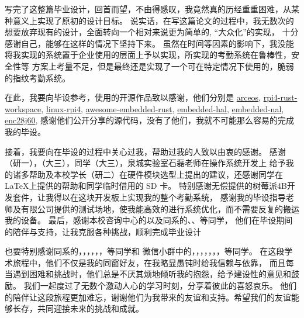 
写完了这整篇毕业设计，回首而望，不由得感叹，我竟然真的历经重重困难，从某种意义上实现了原初的设计目标。
说实话，在写这篇论文的过程中，我无数次的想要放弃现有的设计，全面转向一个相对来说更为简单的, “大众化”的实现，
十分感谢自己，能够在这样的情况下坚持下来。
虽然在时间等因素的影响下，我没能将我实现的系统置于企业使用的层面上予以实现，所实现的考勤系统在鲁棒性，安全性等
方案上考量不足，但是最终还是实现了一个可在特定情况下使用的，脆弱的指纹考勤系统。

在此，我要向毕设参考，使用的开源作品致以感谢，他们分别是 
\href{https://github.com/rcore-os/arceos.git}{arceos}, 
\href{https://github.com/jonlamb-gh/rpi4-rust-workspace.git}{rpi4-rust-workspace},
\href{https://github.com/raspberrypi/linux.git}{linux-rpi4},
\href{https://github.com/rust-embedded/awesome-embedded-rust.git}{awesome-embedded-rust},
\href{https://github.com/rust-embedded/embedded-hal.git}{embedded-hal},
\href{https://github.com/rust-embedded-community/embedded-nal}{embedded-nal},
\href{https://github.com/japaric/enc28j60.git}{enc28j60},
感谢他们公开分享的源代码，没有了他们，我就不可能那么容易的完成我的毕设。

接着，我要向在毕设的过程中关心过我，帮助过我的人致以由衷的感谢。
感谢（研一），（大三），同学（大三），泉城实验室石磊老师在操作系统开发上
给予我的诸多帮助及本校学长（研二）在硬件模块选型上提出的建议，还感谢同学在 \LaTeX 上提供的帮助和同学临时借用的 SD 卡。
特别感谢无偿提供的树莓派4B开发套件，让我得以在这块开发板上实现我的整个考勤系统，
感谢我的毕设指导老师及有限公司提供的测试场地，使我能高效的进行系统优化，而不需要反复的搬运我的设备。
最后，感谢本校咨询中心的以及同系的、、等同学，
他们在毕设期间的陪伴与支持，让我克服各种挑战，顺利完成毕业设计

也要特别感谢同系的，，，，，，等同学和
微信小群中的，，，，，，，等同学。
在这段学术旅程中，他们不仅是我的同窗好友，在我略显愚钝时给我信赖与依靠，
而且每当遇到困难和挑战时，他们总是不厌其烦地倾听我的抱怨，给予建设性的意见和鼓励。
我们一起度过了无数个激动人心的学习时刻，分享着彼此的喜怒哀乐。
他们的陪伴让这段旅程更加难忘，谢谢他们为我带来的友谊和支持。希望我们的友谊能够长存，共同迎接未来的挑战和成就。

